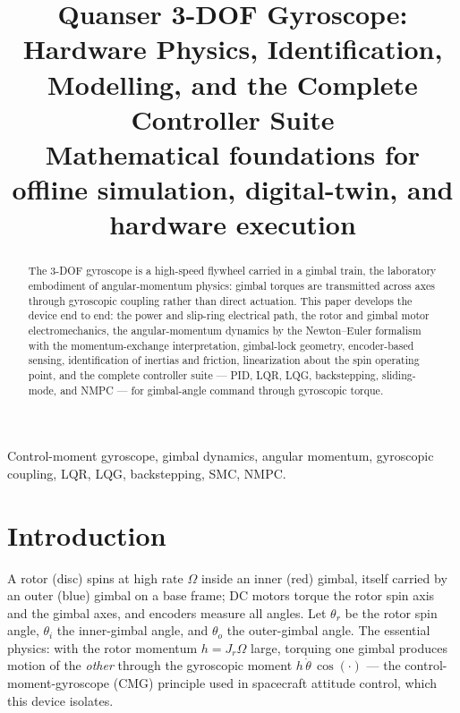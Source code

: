 \documentclass[conference]{IEEEtran}
\begin{document}
\title{Quanser 3-DOF Gyroscope:\\ Hardware Physics, Identification, Modelling, and the Complete Controller Suite\\
{\footnotesize Mathematical foundations for offline simulation, digital-twin, and hardware execution}}

\author{
}

\maketitle

\begin{abstract}
The 3-DOF gyroscope is a high-speed flywheel carried in a gimbal train, the laboratory embodiment of angular-momentum physics: gimbal torques are transmitted across axes through gyroscopic coupling rather than direct actuation. This paper develops the device end to end: the power and slip-ring electrical path, the rotor and gimbal motor electromechanics, the angular-momentum dynamics by the Newton--Euler formalism with the momentum-exchange interpretation, gimbal-lock geometry, encoder-based sensing, identification of inertias and friction, linearization about the spin operating point, and the complete controller suite --- PID, LQR, LQG, backstepping, sliding-mode, and NMPC --- for gimbal-angle command through gyroscopic torque.
\end{abstract}

\begin{IEEEkeywords}
Control-moment gyroscope, gimbal dynamics, angular momentum, gyroscopic coupling, LQR, LQG, backstepping, SMC, NMPC.
\end{IEEEkeywords}

\section{Introduction}
A rotor (disc) spins at high rate $\Omega$ inside an inner (red) gimbal, itself carried by an outer (blue) gimbal on a base frame; DC motors torque the rotor spin axis and the gimbal axes, and encoders measure all angles. Let $\theta_r$ be the rotor spin angle, $\theta_i$ the inner-gimbal angle, and $\theta_o$ the outer-gimbal angle. The essential physics: with the rotor momentum $h = J_r\Omega$ large, torquing one gimbal produces motion of the \emph{other} through the gyroscopic moment $h\,\dot\theta\,\cos(\cdot)$ --- the control-moment-gyroscope (CMG) principle used in spacecraft attitude control, which this device isolates.
\end{document}
